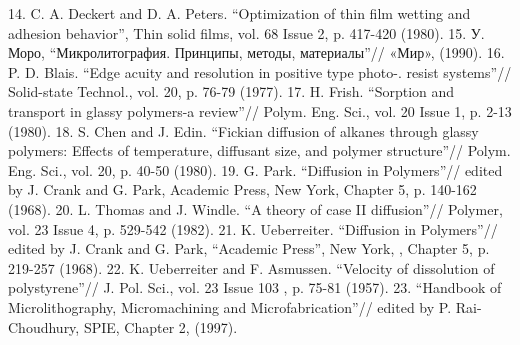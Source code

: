 14. C. A. Deckert and D. A. Peters. “Optimization of thin film wetting and
adhesion behavior”, Thin solid films, vol. 68 Issue 2, p. 417-420 (1980).
15. У. Моро, “Микролитография. Принципы, методы, материалы”//
«Мир», (1990).
16. P. D. Blais. “Edge acuity and resolution in positive type photo-. resist
systems”// Solid-state Technol., vol. 20, p. 76-79 (1977).
17. H. Frish. “Sorption and transport in glassy polymers-a review”// Polym.
Eng. Sci., vol. 20 Issue 1, p. 2-13 (1980).
18. S. Chen and J. Edin. “Fickian diffusion of alkanes through glassy
polymers: Effects of temperature, diffusant size, and polymer structure”//
Polym. Eng. Sci., vol. 20, p. 40-50 (1980).
19. G. Park. “Diffusion in Polymers”// edited by J. Crank and G. Park,
Academic Press, New York, Chapter 5, p. 140-162 (1968).
20. L. Thomas and J. Windle. “A theory of case II diffusion”// Polymer, vol.
23 Issue 4, p. 529-542 (1982).
21. K. Ueberreiter. “Diffusion in Polymers”// edited by J. Crank and G. Park,
“Academic Press”, New York, , Chapter 5, p. 219-257 (1968).
22. K. Ueberreiter and
F.
Asmussen. “Velocity of dissolution of
polystyrene”// J. Pol. Sci., vol. 23 Issue 103 , p. 75-81 (1957).
23. “Handbook
of
Microlithography,
Micromachining
and
Microfabrication”// edited by P. Rai-Choudhury, SPIE, Chapter 2,
(1997).


